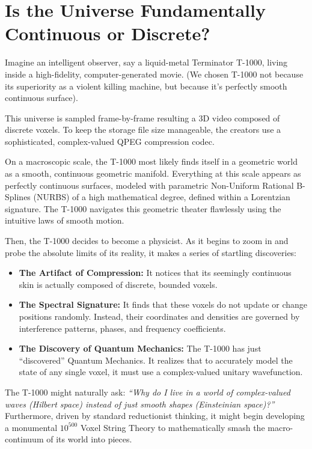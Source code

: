 \section{Is the Universe Fundamentally Continuous or Discrete?}

Imagine an intelligent observer, say a liquid-metal Terminator T-1000, living inside a high-fidelity, computer-generated movie.
(We chosen T-1000 not because its superiority as a violent killing machine, but because it's
perfectly smooth continuous surface).

This universe is sampled frame-by-frame resulting a 3D video composed of discrete voxels.
To keep the storage file size manageable, the creators use a sophisticated, complex-valued QPEG compression codec.

On a macroscopic scale, the T-1000 most likely finds itself in a geometric world as a smooth, continuous geometric manifold.
Everything at this scale appears as perfectly continuous surfaces,
modeled with parametric Non-Uniform Rational B-Splines (NURBS) of a high mathematical degree, defined within a Lorentzian signature.
The T-1000 navigates this geometric theater flawlessly using the intuitive laws of smooth motion. 

Then, the T-1000 decides to become a physicist.
As it begins to zoom in and probe the absolute limits of its reality, it makes a series of startling discoveries:
\begin{itemize}
    \item \textbf{The Artifact of Compression:} It notices that its seemingly continuous skin is actually composed of discrete, bounded voxels.
    \item \textbf{The Spectral Signature:} It finds that these voxels do not update or change positions randomly.
      Instead, their coordinates and densities are governed by interference patterns, phases, and frequency coefficients.
    \item \textbf{The Discovery of Quantum Mechanics:} The T-1000 has just ``discovered'' Quantum Mechanics.
      It realizes that to accurately model the state of any single voxel, it must use a complex-valued unitary wavefunction.
\end{itemize}

The T-1000 might naturally ask: \emph{``Why do I live in a world of complex-valued waves (Hilbert space) instead of just smooth shapes (Einsteinian space)?''}
Furthermore, driven by standard reductionist thinking, it might begin developing a monumental $10^{500}$ Voxel String Theory to mathematically smash the macro-continuum of its world into pieces.

